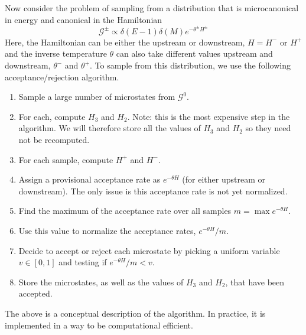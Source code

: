 \documentclass[12pt]{article}
\newcommand{\Gibbs}{\mathcal{G}}
\begin{document}
Now consider the problem of sampling from a distribution that is microcanonical in energy and canonical in the Hamiltonian
\begin{equation}
\Gibbs^{\pm} \propto \delta(E-1) \delta(M) e^{-\theta^{\pm} H^{\pm}}
\end{equation}
Here, the Hamiltonian can be either the upstream or downstream, $H = H^-$ or $H^+$ and the inverse temperature $\theta$ can also take different values upstream and downstream, $\theta^-$ and $\theta^+$. To sample from this distribution, we use the following acceptance/rejection algorithm.
\begin{enumerate}
\item Sample a large number of microstates from $\Gibbs^0$.
\item For each, compute $H_3$ and $H_2$. Note: this is the most expensive step in the algorithm. We will therefore store all the values of $H_3$ and $H_2$ so they need not be recomputed.
\item For each sample, compute $H^+$ and $H^-$.
\item Assign a provisional acceptance rate as $e^{- \theta H}$ (for either upstream or downstream). The only issue is this acceptance rate is not yet normalized.
\item Find the maximum of the acceptance rate over all samples $m = \max{e^{-\theta H}}$.
\item Use this value to normalize the acceptance rates, $e^{- \theta H}/m$.
\item Decide to accept or reject each microstate by picking a uniform variable $v \in [0,1]$ and testing if $e^{- \theta H}/m < v$.
\item Store the microstates, as well as the values of $H_3$ and $H_2$, that have been accepted.
\end{enumerate}
The above is a conceptual description of the algorithm. In practice, it is implemented in a way to be computational efficient.


\end{document}
